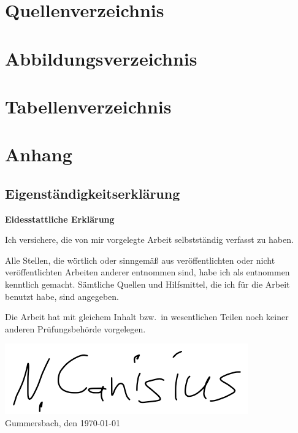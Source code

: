 \appendix

\newpage


\section{Quellenverzeichnis}
\printbibliography

\newpage


\section{Abbildungsverzeichnis}
\listoffigures


\section{Tabellenverzeichnis}
\listoftables

\newpage


\section{Anhang}

\subsection{Eigenständigkeitserklärung}

\textbf{Eidesstattliche Erklärung}

Ich versichere, die von mir vorgelegte Arbeit selbstständig verfasst zu haben.

Alle Stellen, die wörtlich oder sinngemäß aus veröffentlichten oder nicht veröffentlichten Arbeiten anderer entnommen sind, habe ich als entnommen kenntlich gemacht.
Sämtliche Quellen und Hilfsmittel, die ich für die Arbeit benutzt habe, sind angegeben.

Die Arbeit hat mit gleichem Inhalt bzw.\ in wesentlichen Teilen noch keiner anderen Prüfungsbehörde vorgelegen.

\includegraphics[scale=0.5]{assets/signature}\\
Gummersbach, den \today
